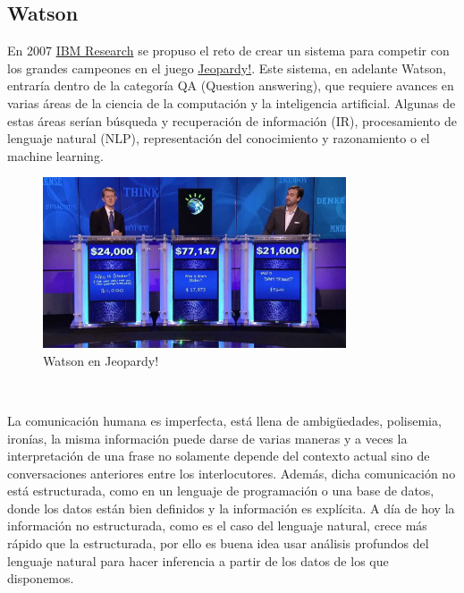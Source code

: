 \documentclass[paper=a4, fontsize=10pt]{scrartcl} %
\numberwithin{equation}{section} %
\numberwithin{figure}{section} %
\numberwithin{table}{section} %
\begin{document}
\subsection{Watson}
En 2007 \href{https://www.research.ibm.com/}{IBM Research} se propuso el reto de crear un sistema para competir con los grandes campeones en el juego \href{https://www.jeopardy.com/}{Jeopardy!}. 
Este sistema, en adelante Watson, entraría dentro de la categoría QA (Question answering), que requiere avances en varias áreas de la ciencia de la computación y la inteligencia artificial. 
Algunas de estas áreas serían búsqueda y recuperación de información (IR), procesamiento de lenguaje natural (NLP), representación del conocimiento y razonamiento o el machine learning.

\begin{figure}[H]
	\centering
	\label{j-watson}
	\includegraphics[width=0.8\textwidth]{./Imagenes/j-watson.jpg}
	\caption{Watson en Jeopardy!}
\end{figure}

\

La comunicación humana es imperfecta, está llena de ambigüedades, polisemia, ironías, la misma información puede darse de varias maneras y a veces la interpretación de una frase no solamente depende del contexto actual sino de conversaciones anteriores entre los interlocutores.
Además, dicha comunicación no está estructurada, como en un lenguaje de programación o una base de datos, donde los datos están bien definidos y la información es explícita.
A día de hoy la información no estructurada, como es el caso del lenguaje natural, crece más rápido que la estructurada, por ello es buena idea usar análisis profundos del lenguaje natural para hacer inferencia a partir de los datos de los que disponemos.

\
\end{document}
